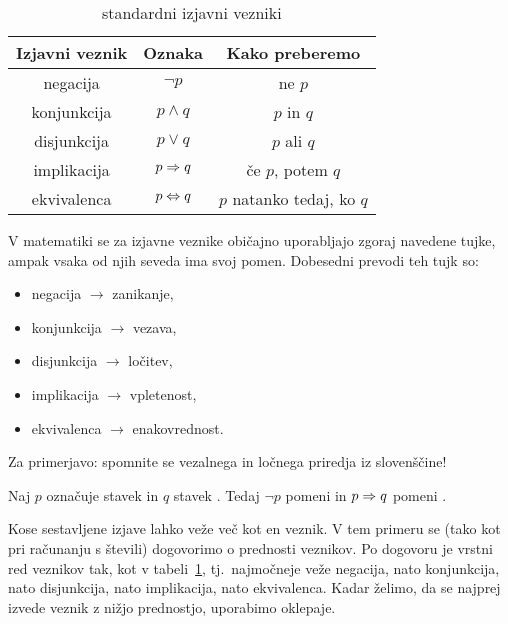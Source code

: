 		\begin{table}[!ht]
			\centering
			\begin{tabular}{|ccc|}
				\hline
				\textbf{Izjavni veznik} & \textbf{Oznaka} & \textbf{Kako preberemo} \\
				\hline
				negacija & $\lnot{p}$ & ne $p$ \\
				konjunkcija & $p \land q$ & $p$ in $q$ \\
				disjunkcija & $p \lor q$ & $p$ ali $q$ \\
				implikacija & $p \Rightarrow q$ & če $p$, potem $q$ \\
				ekvivalenca & $p \Leftrightarrow q$ & $p$ natanko tedaj, ko $q$ \\
				\hline
			\end{tabular}
			\caption{standardni izjavni vezniki}\label{TABELA: standardni izjavni vezniki}
		\end{table}
		
		\begin{opomba}
			V matematiki se za izjavne veznike običajno uporabljajo zgoraj navedene tujke, ampak vsaka od njih seveda ima svoj pomen. Dobesedni prevodi teh tujk so:
			\begin{itemize}
				\item
					negacija $\to$ zanikanje,
				\item
					konjunkcija $\to$ vezava,
				\item
					disjunkcija $\to$ ločitev,
				\item
					implikacija $\to$ vpletenost,
				\item
					ekvivalenca $\to$ enakovrednost.
			\end{itemize}
			Za primerjavo: spomnite se vezalnega in ločnega priredja iz slovenščine!
		\end{opomba}
		
		\begin{zgled}
			Naj $p$ označuje stavek  in $q$ stavek . Tedaj $\lnot{p}$ pomeni  in $p \Rightarrow q$ pomeni .
		\end{zgled}
		
		Kose sestavljene izjave lahko veže več kot en veznik. V tem primeru se (tako kot pri računanju s števili) dogovorimo o prednosti veznikov. Po dogovoru je vrstni red veznikov tak, kot v tabeli~\ref{TABELA: standardni izjavni vezniki}, tj.~najmočneje veže negacija, nato konjunkcija, nato disjunkcija, nato implikacija, nato ekvivalenca. Kadar želimo, da se najprej izvede veznik z nižjo prednostjo, uporabimo oklepaje.
		

